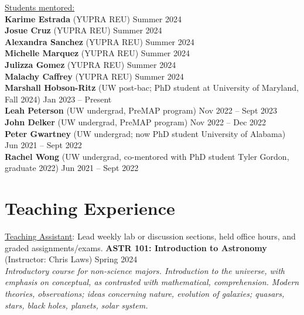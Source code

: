 \documentclass[a4,11pt]{article}
\begin{document}
\vspace{.3cm}
\underline{Students mentored:} \\
\vspace{.1cm}
\textbf{Karime Estrada} (YUPRA REU) \hfill Summer 2024 \\
\vspace{.1cm}
\textbf{Josue Cruz} (YUPRA REU) \hfill Summer 2024 \\
\vspace{.1cm}
\textbf{Alexandra Sanchez} (YUPRA REU) \hfill Summer 2024 \\
\vspace{.1cm}
\textbf{Michelle Marquez} (YUPRA REU) \hfill Summer 2024 \\
\vspace{.1cm}
\textbf{Julizza Gomez} (YUPRA REU) \hfill Summer 2024 \\
\vspace{.1cm}
\textbf{Malachy Caffrey} (YUPRA REU) \hfill Summer 2024 \\
\vspace{.1cm}
\textbf{Marshall Hobson-Ritz} (UW post-bac; PhD student at University of Maryland, Fall 2024) \hfill Jan 2023 -- Present \\
\vspace{.1cm}
\textbf{Leah Peterson} (UW undergrad, PreMAP program) \hfill Nov 2022 -- Sept 2023 \\
\vspace{.1cm}
\textbf{John Delker} (UW undergrad, PreMAP program) \hfill Nov 2022 -- Dec 2022 \\
\vspace{.1cm}
\textbf{Peter Gwartney} (UW undergrad; now PhD student University of Alabama) \hfill Jun 2021 -- Sept 2022 \\
\vspace{.1cm}
\textbf{Rachel Wong} (UW undergrad, co-mentored with PhD student Tyler Gordon, graduate 2022) \hfill Jun 2021 -- Sept 2022 

\clearpage
\section{Teaching Experience}

\underline{Teaching Assistant}: Lead weekly lab or discussion sections, held office hours, and graded assignments/exams. \vspace{.3cm} \newline
\textbf{ASTR 101: Introduction to Astronomy} (Instructor: Chris Laws) \hfill Spring 2024  \\
\textsl{Introductory course for non-science majors. Introduction to the universe, with emphasis on conceptual, as contrasted with mathematical, comprehension. Modern theories, observations; ideas concerning nature, evolution of galaxies; quasars, stars, black holes, planets, solar system.} \vspace{.2cm}
\end{document}
